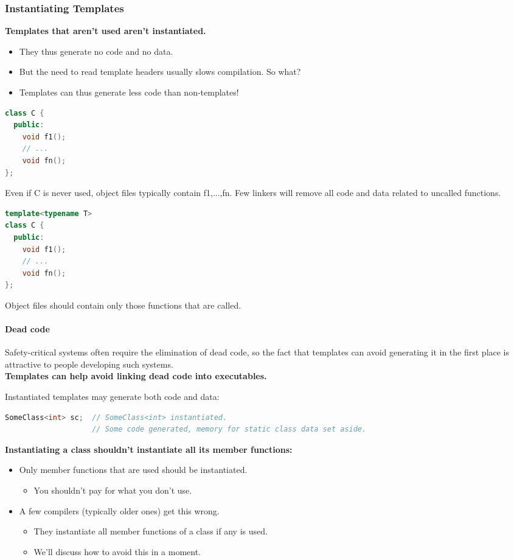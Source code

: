 \subsubsection{Instantiating Templates}
\textbf{Templates that aren't used aren't instantiated.}
\begin{itemize}
  \item They thus generate no code and no data.
  \item But the need to read template headers usually slows compilation. So what?
  \item Templates can thus generate less code than non-templates!
\end{itemize}
\begin{multicols}{2}
\begin{lstlisting}[language=C++]
class C {
  public:
    void f1();
    // ...
    void fn();
};
\end{lstlisting}
Even if C is never used, object files typically contain f1,...,fn. Few linkers will remove all code and data related to uncalled functions.
\vfill\null
\columnbreak
\begin{lstlisting}[language=C++]
template<typename T>
class C {
  public:
    void f1();
    // ...
    void fn();
};
\end{lstlisting}
Object files should contain only those functions that are called.
\end{multicols}

\paragraph{Dead code}
Safety-critical systems often require the elimination of dead code, so the fact that templates can avoid generating it in the first place is attractive to people developing such systems.\\
\textbf{Templates can help avoid linking dead code into executables.}

Instantiated templates may generate both code and data:
\begin{lstlisting}[language=C++]
SomeClass<int> sc;  // SomeClass<int> instantiated.
                    // Some code generated, memory for static class data set aside.
\end{lstlisting}
\textbf{Instantiating a class shouldn't instantiate all its member functions:}
\begin{itemize}
  \item Only member functions that are used should be instantiated.
  \begin{itemize}
    \item You shouldn't pay for what you don't use.
  \end{itemize}
  \item A few compilers (typically older ones) get this wrong.
  \begin{itemize}
    \item They instantiate all member functions of a class if any is used.
    \item We'll discuss how to avoid this in a moment.
  \end{itemize}
\end{itemize}

